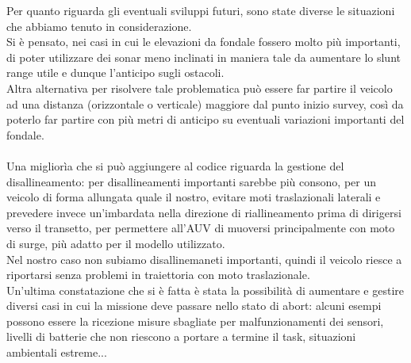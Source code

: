 \documentclass{article}
\begin{document}
            
            Per quanto riguarda gli eventuali sviluppi futuri, sono state diverse le situazioni che abbiamo tenuto in considerazione.\\   
            Si è pensato, nei casi in cui le elevazioni da fondale fossero molto più importanti, di poter utilizzare dei sonar meno inclinati in maniera tale da aumentare 
            lo slunt range utile e dunque
            l'anticipo sugli ostacoli.\\
            Altra alternativa per risolvere tale problematica può essere far partire il veicolo ad una
            distanza (orizzontale o verticale) maggiore dal punto inizio survey, così da poterlo far partire con più metri di anticipo su eventuali variazioni importanti del fondale.\\
            \\
            Una migliorìa che si può aggiungere al codice riguarda la gestione del disallineamento: per disallineamenti importanti sarebbe più consono, per un veicolo di forma allungata 
            quale il nostro, evitare moti traslazionali laterali e prevedere invece un'imbardata nella direzione di
            riallineamento prima di dirigersi verso il transetto, per permettere all'AUV di muoversi principalmente con moto di surge, più adatto per il modello utilizzato.
            \\
            Nel nostro caso non subiamo 
            disallinemaneti importanti, quindi il veicolo riesce a riportarsi senza problemi in traiettoria con moto traslazionale.\\
            Un'ultima constatazione che si è fatta è stata la possibilità di aumentare e gestire diversi casi in cui la missione deve passare nello stato 
            di abort: alcuni esempi possono essere la ricezione misure sbagliate per malfunzionamenti dei sensori, livelli di batterie che non riescono a portare 
            a termine il task, situazioni ambientali estreme...

        \clearpage
        \listoffigures
        \newpage
        \printbibliography
\end{document}
